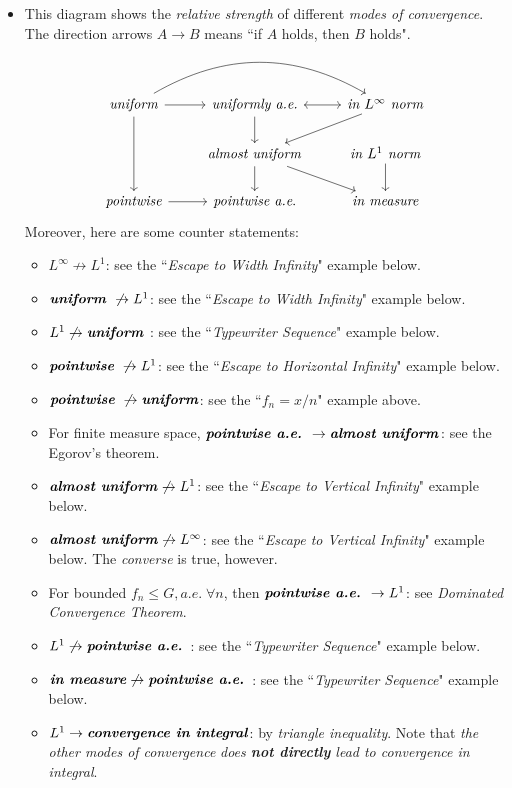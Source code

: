 \documentclass[11pt]{article}
\begin{document}
\begin{itemize}
\item \begin{remark} This diagram shows the \emph{relative strength} of different \emph{modes of convergence}. The direction arrows $A \rightarrow B$ means ``if $A$ holds, then $B$ holds".
\[
  \begin{tikzcd}
     \text{\emph{uniform}} \arrow{dd}{}  \arrow{r}{}  \arrow[rr, swap, bend left] & \text{\emph{uniformly a.e.}}  \arrow{d}{} & \arrow[l, leftrightarrow] \text{\emph{in $L^{\infty}$ norm}} \arrow{dl}{} \\
      & \text{\emph{almost uniform}}  \arrow{d}{} \arrow{dr}{} &  \text{\emph{in $L^{1}$ norm}} \arrow{d}{} \\
    \text{\emph{pointwise}}  \arrow{r}{} &   \text{\emph{pointwise a.e}.} & \text{\emph{in measure}}
  \end{tikzcd}
\] 
Moreover, here are some counter statements:
\begin{itemize}
\item $L^{\infty} \not\rightarrow L^{1}$: see the ``\emph{Escape to Width Infinity}" example below.
\item $\text{\emph{\textbf{uniform}} } \not\rightarrow L^{1}$: see the ``\emph{Escape to Width Infinity}" example below.
\item $L^{1}  \not\rightarrow \text{\emph{\textbf{uniform}} }$: see the ``\emph{Typewriter Sequence}" example below.
\item $\text{\emph{\textbf{pointwise}} } \not\rightarrow L^{1}$: see the ``\emph{Escape to Horizontal Infinity}" example below.
\item $\text{\emph{\textbf{pointwise}} } \not\rightarrow \text{\emph{\textbf{uniform}}}$: see the ``$f_n = x/n$" example above.
\item For finite measure space, $\text{\emph{\textbf{pointwise a.e.}} } \rightarrow \text{\emph{\textbf{almost uniform}}}$: see the Egorov's theorem.
\item $\text{\emph{\textbf{almost uniform}}}  \not\rightarrow L^{1}$: see the ``\emph{Escape to Vertical Infinity}" example below.
\item $\text{\emph{\textbf{almost uniform}}}  \not\rightarrow L^{\infty}$: see the ``\emph{Escape to Vertical Infinity}" example below. The \emph{converse} is true, however.
\item For bounded $f_n \le G, a.e.\; \forall n$, then $\text{\emph{\textbf{pointwise a.e.}} } \rightarrow L^{1}$: see \emph{Dominated Convergence Theorem}. 
\item $L^{1}  \not\rightarrow \text{\emph{\textbf{pointwise a.e.}} }$: see the ``\emph{Typewriter Sequence}" example below.
\item $\text{\emph{\textbf{in measure}}} \not\rightarrow \text{\emph{\textbf{pointwise a.e.}} }$: see the ``\emph{Typewriter Sequence}" example below.
\item $L^{1}  \rightarrow \text{\emph{\textbf{convergence in integral}}}$:  by \emph{triangle inequality}. Note that \emph{the other modes of convergence} \emph{does \textbf{not directly} lead to convergence in integral}.
\end{itemize} 
\end{remark}
\end{itemize}
\end{document}
